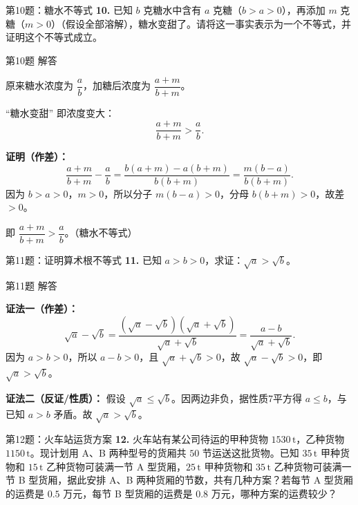 \documentclass[10pt,aspectratio=169,serif]{beamer}
\begin{document}
\begin{frame}[t]{第10题：糖水不等式}
\textbf{10.} 已知 $b$ 克糖水中含有 $a$ 克糖（$b>a>0$），再添加 $m$ 克糖（$m>0$）（假设全部溶解），糖水变甜了。请将这一事实表示为一个不等式，并证明这个不等式成立。
\end{frame}

\begin{frame}[t]{第10题 解答}
\begin{tcolorbox}[colback=orange!10,colframe=orange,title=\textbf{解}]
原来糖水浓度为 $\dfrac{a}{b}$，加糖后浓度为 $\dfrac{a+m}{b+m}$。

“糖水变甜” 即浓度变大：
\[
\frac{a+m}{b+m} > \frac{a}{b}.
\]

\textbf{证明（作差）：}
\[
\frac{a+m}{b+m}-\frac{a}{b}
= \frac{b(a+m)-a(b+m)}{b(b+m)}
= \frac{m(b-a)}{b(b+m)}.
\]
因为 $b>a>0$，$m>0$，所以分子 $m(b-a)>0$，分母 $b(b+m)>0$，故差 $>0$。

\vspace{0.3em}
即 \alert{$\dfrac{a+m}{b+m}>\dfrac{a}{b}$}。\small（糖水不等式）
\end{tcolorbox}
\end{frame}

\begin{frame}[t]{第11题：证明算术根不等式}
\textbf{11.} 已知 $a>b>0$，求证：$\sqrt{a}>\sqrt{b}$。
\end{frame}

\begin{frame}[t]{第11题 解答}
\begin{tcolorbox}[colback=orange!10,colframe=orange,title=\textbf{证明}]
\textbf{证法一（作差）：}
\[
\sqrt{a}-\sqrt{b}
= \frac{(\sqrt{a}-\sqrt{b})(\sqrt{a}+\sqrt{b})}{\sqrt{a}+\sqrt{b}}
= \frac{a-b}{\sqrt{a}+\sqrt{b}}.
\]
因为 $a>b>0$，所以 $a-b>0$，且 $\sqrt{a}+\sqrt{b}>0$，故 $\sqrt{a}-\sqrt{b}>0$，即 $\sqrt{a}>\sqrt{b}$。

\vspace{0.5em}
\textbf{证法二（反证/性质）：} 假设 $\sqrt{a}\le\sqrt{b}$。因两边非负，据性质7平方得 $a\le b$，与已知 $a>b$ 矛盾。故 $\sqrt{a}>\sqrt{b}$。
\end{tcolorbox}
\end{frame}

\begin{frame}[t]{第12题：火车站运货方案}
\textbf{12.} 火车站有某公司待运的甲种货物 $1530\,\mathrm{t}$，乙种货物 $1150\,\mathrm{t}$。现计划用 A、B 两种型号的货厢共 $50$ 节运送这批货物。已知 $35\,\mathrm{t}$ 甲种货物和 $15\,\mathrm{t}$ 乙种货物可装满一节 A 型货厢，$25\,\mathrm{t}$ 甲种货物和 $35\,\mathrm{t}$ 乙种货物可装满一节 B 型货厢，据此安排 A、B 两种货厢的节数，共有几种方案？若每节 A 型货厢的运费是 $0.5$ 万元，每节 B 型货厢的运费是 $0.8$ 万元，哪种方案的运费较少？
\end{frame}
\end{document}
